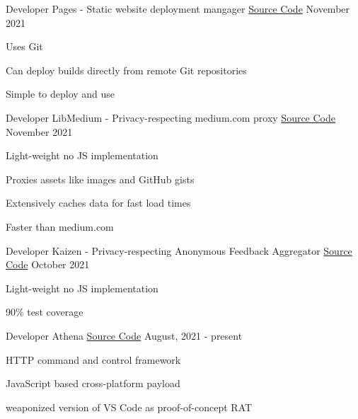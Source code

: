 
\begin{cventries}
  \cventry
	{Developer}
	{Pages - Static website deployment mangager}
	{\href{https://github.com/realaravinth/pages}{Source Code}}
	{November 2021}
	{
		\begin{cvitems}
			\item {Uses Git}
			\item {Can deploy builds directly from remote Git repositories}
			\item {Simple to deploy and use}
		\end{cvitems}
	}

  \cventry
	{Developer}
	{LibMedium - Privacy-respecting medium.com proxy}
	{\href{https://github.com/realaravinth/libmedium}{Source Code}}
	{November 2021}
	{
		\begin{cvitems}
			\item {Light-weight no JS implementation}
			\item {Proxies assets like images and GitHub gists}
			\item {Extensively caches data for fast load times}
			\item {Faster than medium.com}
		\end{cvitems}
	}

  \cventry
	{Developer}
	{Kaizen - Privacy-respecting Anonymous Feedback Aggregator}
	{\href{https://github.com/realaravinth/kaizen}{Source Code}}
	{October 2021}
	{
		\begin{cvitems}
			\item {Light-weight no JS implementation}
			\item {90\% test coverage}
		\end{cvitems}
	}

  \cventry
    {Developer} %
    {Athena} %
    {\href{https://github.com/realaravinth/athena}{Source Code}} %
    {August, 2021 - present} %
    {
      \begin{cvitems} %
        \item {HTTP command and control framework}
        \item {JavaScript based cross-platform payload}
        \item {weaponized version of VS Code as proof-of-concept RAT}
      \end{cvitems}
    }
  

\end{cventries}
